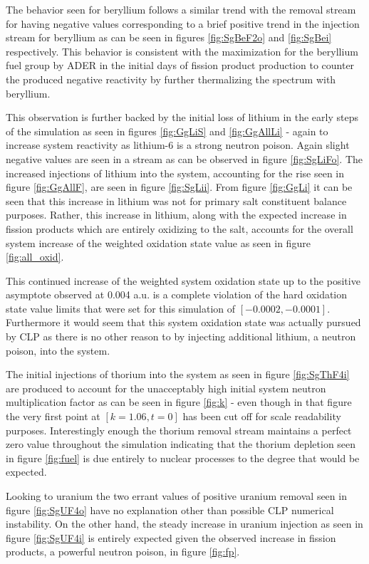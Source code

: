 The behavior seen for beryllium follows a similar trend with the removal stream
for  having negative values corresponding to a brief positive trend
in the injection stream for beryllium as can be seen in figures
\ref{fig:SgBeF2o} and \ref{fig:SgBei} respectively. This behavior is consistent
with the maximization for the beryllium fuel group by ADER in the initial days
of fission product production to counter the produced negative reactivity by
further thermalizing the spectrum with beryllium. 

This observation is further backed by the initial loss of lithium in the
early steps of the simulation as seen in figures \ref{fig:GgLiS} and 
\ref{fig:GgAllLi} - again to increase system reactivity as lithium-6 is a
strong neutron poison. Again slight negative values are seen in a stream as can
be observed in figure \ref{fig:SgLiFo}. The increased injections of lithium 
into the system, accounting for the rise seen in figure \ref{fig:GgAllF}, are
seen in figure \ref{fig:SgLii}. From figure \ref{fig:GgLi} it can be seen that
this increase in lithium was not for primary salt constituent balance purposes.
Rather, this increase in lithium, along with the expected increase in fission
products which are entirely oxidizing to the salt, accounts for the overall
system increase of the weighted oxidation state value as seen in figure
\ref{fig:all_oxid}.

This continued increase of the weighted system oxidation state up to the
positive asymptote observed at 0.004 a.u. is a complete violation of the 
hard oxidation state value limits that were set for this simulation of 
$[-0.0002, -0.0001]$. Furthermore it would seem that this system oxidation
state was actually pursued by CLP as there is no other reason to by injecting
additional lithium, a neutron poison, into the system.

The initial injections of thorium into the system as seen in figure
\ref{fig:SgThF4i} are produced to account for the unacceptably high 
initial system neutron multiplication factor as can be seen in figure
\ref{fig:k} - even though in that figure the very first point at $[k=1.06,t=0]$
has been cut off for scale readability purposes. Interestingly enough the
thorium removal stream maintains a perfect zero value throughout 
the simulation indicating that the thorium depletion seen in figure
\ref{fig:fuel} is due entirely to nuclear processes to the degree that would be
expected.

Looking to uranium the two errant values of positive uranium removal seen in
figure \ref{fig:SgUF4o} have no explanation other than possible CLP numerical
instability. On the other hand, the steady increase in uranium injection
as seen in figure \ref{fig:SgUF4i} is entirely expected given the observed
increase in fission products, a powerful neutron poison, in figure \ref{fig:fp}.

